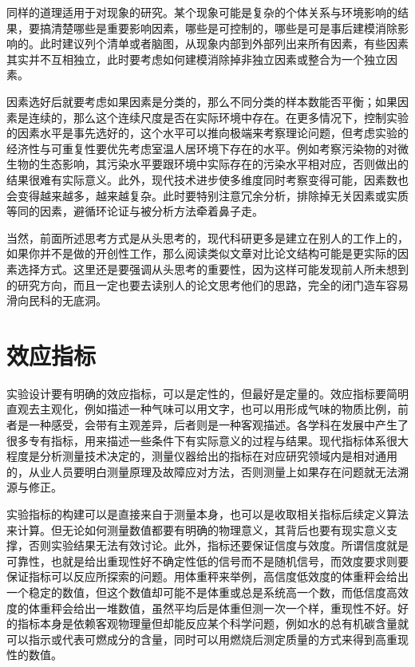 \documentclass[]{tufte-book}
\begin{document}
同样的道理适用于对现象的研究。某个现象可能是复杂的个体关系与环境影响的结果，要搞清楚哪些是重要影响因素，哪些是可控制的，哪些是可是事后建模消除影响的。此时建议列个清单或者脑图，从现象内部到外部列出来所有因素，有些因素其实并不互相独立，此时要考虑如何建模消除掉非独立因素或整合为一个独立因素。

因素选好后就要考虑如果因素是分类的，那么不同分类的样本数能否平衡；如果因素是连续的，那么这个连续尺度是否在实际环境中存在。在更多情况下，控制实验的因素水平是事先选好的，这个水平可以推向极端来考察理论问题，但考虑实验的经济性与可重复性要优先考虑室温人居环境下存在的水平。例如考察污染物的对微生物的生态影响，其污染水平要跟环境中实际存在的污染水平相对应，否则做出的结果很难有实际意义。此外，现代技术进步使多维度同时考察变得可能，因素数也会变得越来越多，越来越复杂。此时要特别注意冗余分析，排除掉无关因素或实质等同的因素，避循环论证与被分析方法牵着鼻子走。

当然，前面所述思考方式是从头思考的，现代科研更多是建立在别人的工作上的，如果你并不是做的开创性工作，那么阅读类似文章对比论文结构可能是更实际的因素选择方式。这里还是要强调从头思考的重要性，因为这样可能发现前人所未想到的研究方向，而且一定也要去读别人的论文思考他们的思路，完全的闭门造车容易滑向民科的无底洞。

\hypertarget{ux6548ux5e94ux6307ux6807}{%
\section{效应指标}\label{ux6548ux5e94ux6307ux6807}}

实验设计要有明确的效应指标，可以是定性的，但最好是定量的。效应指标要简明直观去主观化，例如描述一种气味可以用文字，也可以用形成气味的物质比例，前者是一种感受，会带有主观差异，后者则是一种客观描述。各学科在发展中产生了很多专有指标，用来描述一些条件下有实际意义的过程与结果。现代指标体系很大程度是分析测量技术决定的，测量仪器给出的指标在对应研究领域内是相对通用的，从业人员要明白测量原理及故障应对方法，否则测量上如果存在问题就无法溯源与修正。

实验指标的构建可以是直接来自于测量本身，也可以是收取相关指标后续定义算法来计算。但无论如何测量数值都要有明确的物理意义，其背后也要有现实意义支撑，否则实验结果无法有效讨论。此外，指标还要保证信度与效度。所谓信度就是可靠性，也就是给出重现性好不确定性低的信号而不是随机信号，而效度要求则要保证指标可以反应所探索的问题。用体重秤来举例，高信度低效度的体重秤会给出一个稳定的数值，但这个数值却可能不是体重或总是系统高一个数，而低信度高效度的体重秤会给出一堆数值，虽然平均后是体重但测一次一个样，重现性不好。好的指标本身是依赖客观物理量但却能反应某个科学问题，例如水的总有机碳含量就可以指示或代表可燃成分的含量，同时可以用燃烧后测定质量的方式来得到高重现性的数值。
\end{document}

